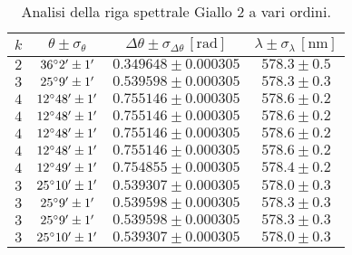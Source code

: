 \documentclass[]{article}
\begin{document}
    \begin{table}[H]
        \centering
        \begin{tabular}{||c|c|c|c||}
            \hline
            $k$ & $\theta \pm \sigma_{\theta}$ & $\Delta\theta \pm \sigma_{\Delta\theta} \, \left[\text{rad}\right]$ & $\lambda \pm \sigma_{\lambda} \, \left[\text{nm}\right]$ \\\hline
            \hline
            $2$ & $36\degree  2' \pm 1'$ & $0.349648 \pm 0.000305$ & $578.3 \pm 0.5$ \\\hline
            $3$ & $25\degree  9' \pm 1'$ & $0.539598 \pm 0.000305$ & $578.3 \pm 0.3$ \\\hline
            $4$ & $12\degree 48' \pm 1'$ & $0.755146 \pm 0.000305$ & $578.6 \pm 0.2$ \\\hline
            $4$ & $12\degree 48' \pm 1'$ & $0.755146 \pm 0.000305$ & $578.6 \pm 0.2$ \\\hline
            $4$ & $12\degree 48' \pm 1'$ & $0.755146 \pm 0.000305$ & $578.6 \pm 0.2$ \\\hline
            $4$ & $12\degree 48' \pm 1'$ & $0.755146 \pm 0.000305$ & $578.6 \pm 0.2$ \\\hline
            $4$ & $12\degree 49' \pm 1'$ & $0.754855 \pm 0.000305$ & $578.4 \pm 0.2$ \\\hline
            $3$ & $25\degree 10' \pm 1'$ & $0.539307 \pm 0.000305$ & $578.0 \pm 0.3$ \\\hline
            $3$ & $25\degree  9' \pm 1'$ & $0.539598 \pm 0.000305$ & $578.3 \pm 0.3$ \\\hline
            $3$ & $25\degree  9' \pm 1'$ & $0.539598 \pm 0.000305$ & $578.3 \pm 0.3$ \\\hline
            $3$ & $25\degree 10' \pm 1'$ & $0.539307 \pm 0.000305$ & $578.0 \pm 0.3$ \\\hline
        \end{tabular}
        \caption{Analisi della riga spettrale Giallo 2 a vari ordini.}
        \label{giallo-2}
    \end{table}
\end{document}
